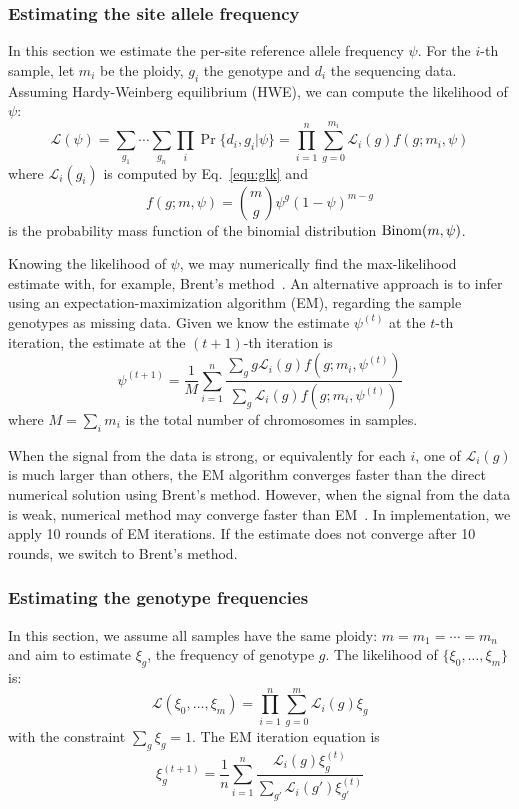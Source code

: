 \documentclass{bioinfo}
\begin{document}
\begin{methods}
\subsubsection{Estimating the site allele frequency}
In this section we estimate the per-site reference allele frequency $\psi$.  For the
$i$-th sample, let $m_i$ be the ploidy, $g_i$ the genotype and $d_i$ the
sequencing data.  Assuming Hardy-Weinberg equilibrium (HWE), we can compute the
likelihood of $\psi$:
\begin{equation}\label{equ:flk}
\mathcal{L}(\psi)=\sum_{g_1}\cdots\sum_{g_n}\prod_i\Pr\{d_i,g_i|\psi\}=\prod_{i=1}^n\sum_{g=0}^{m_i}\mathcal{L}_i(g)f(g;m_i,\psi)
\end{equation}
where $\mathcal{L}_i(g_i)$ is computed by Eq.~\eqref{equ:glk} and
\begin{equation}
f(g;m,\psi)=\binom{m}{g}\psi^g(1-\psi)^{m-g}
\end{equation}
is the probability mass function of the binomial distribution ${\rm
Binom}(m,\psi)$.

Knowing the likelihood of $\psi$, we may numerically find the max-likelihood
estimate with, for example, Brent's method~\citep{Brent:1973kx}. An alternative
approach is to infer using an expectation-maximization algorithm (EM),
regarding the sample genotypes as missing data. Given we know the estimate
$\psi^{(t)}$ at the $t$-th iteration, the estimate at the $(t+1)$-th iteration
is
\begin{equation}\label{eq:saf-em}
\psi^{(t+1)}=\frac{1}{M}\sum_{i=1}^n\frac{\sum_{g}g\mathcal{L}_i(g)f(g;m_i,\psi^{(t)})}{\sum_{g}\mathcal{L}_i(g)f(g;m_i,\psi^{(t)})}
\end{equation}
where $M=\sum_im_i$ is the total number of chromosomes in samples.

When the signal from the data is strong, or equivalently for each $i$, one of
$\mathcal{L}_i(g)$ is much larger than others, the EM algorithm converges
faster than the direct numerical solution using Brent's method. However, when
the signal from the data is weak, numerical method may converge faster than
EM~\citep{Kim:2011fk}. In implementation, we apply 10 rounds of EM iterations.
If the estimate does not converge after 10 rounds, we switch to Brent's method.

\subsubsection{Estimating the genotype frequencies}
In this section, we assume all samples have the same ploidy: $m=m_1=\cdots=m_n$
and aim to estimate $\xi_g$, the frequency of genotype $g$. The likelihood of
$\{\xi_0,\ldots,\xi_m\}$ is:
\begin{equation}
\mathcal{L}(\xi_0,\ldots,\xi_m)=\prod_{i=1}^n\sum_{g=0}^{m}\mathcal{L}_i(g)\xi_g
\end{equation}
with the constraint $\sum_g\xi_g=1$. The EM iteration equation is
\begin{equation}\label{eq:sgf-em}
\xi^{(t+1)}_g=\frac{1}{n}\sum_{i=1}^n\frac{\mathcal{L}_i(g)\xi^{(t)}_g}{\sum_{g'}\mathcal{L}_i(g')\xi_{g'}^{(t)}}
\end{equation}


\end{methods}
\end{document}
